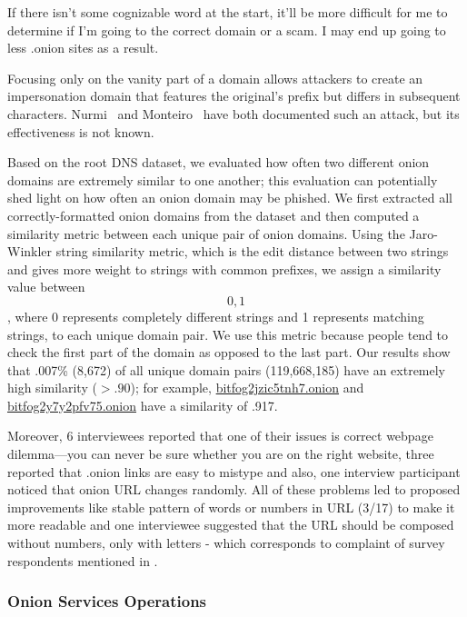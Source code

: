 \begin{displayquote}
If there isn't some cognizable word at the start, it'll be more difficult for me
to determine if I'm going to the correct domain or a scam. I may end up going to
less .onion sites as a result.
\end{displayquote}

Focusing only on the vanity part of a domain allows attackers to create an
impersonation domain that features the original's prefix but differs in
subsequent characters.  Nurmi~\cite{Nurmi2015a} and
Monteiro~\cite{Monteiro2016a} have both documented such an attack, but its
effectiveness is not known.

Based on the root DNS dataset, we evaluated how often two different onion
domains are extremely similar to one another; this evaluation can potentially
shed light on how often an onion domain may be phished.  We first extracted all
correctly-formatted onion domains from the dataset and then computed a
similarity metric between each unique pair of onion domains.  Using the
Jaro-Winkler string similarity metric, which is the edit distance between two
strings and gives more weight to strings with common prefixes, we assign a
similarity value between \[0,1\], where 0 represents completely different
strings and 1 represents matching strings, to each unique domain pair. We use
this metric because people tend to check the first part of the domain as opposed
to the last part.  Our results show that .007\% (8,672) of all unique domain
pairs (119,668,185) have an extremely high similarity ($> .90$); for example,
\url{bitfog2jzic5tnh7.onion} and \url{bitfog2y7y2pfv75.onion} have a similarity
of .917.

Moreover, 6 interviewees reported that one of their issues is correct webpage
dilemma---you can never be sure whether you are on the right website, three
reported that .onion links are easy to mistype and also, one interview
participant noticed that onion URL changes randomly. All of these problems led
to proposed improvements like stable pattern of words or numbers in URL (3/17)
to make it more readable and one interviewee suggested that the URL should be
composed without numbers, only with letters - which corresponds to complaint of
survey respondents mentioned in .

\subsubsection{Onion Services Operations}

